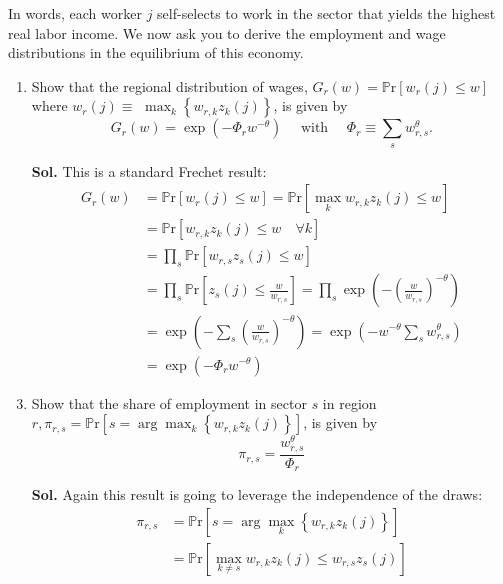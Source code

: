 \documentclass[12pt,oneside,reqno]{amsart}
\newcommand{\pr}{\mathbb{P}\mathrm{r}}
\begin{document}
In words, each worker $j$ self-selects to work in the sector that yields the highest real labor income. We now ask you to derive the employment and wage distributions in the equilibrium of this economy.
\begin{enumerate}[leftmargin=15pt,label=\textbf{\roman*.}]
    \item Show that the regional distribution of wages, $G_{r}(w)=\pr\left[w_{r}(j) \leq w\right]$ where $w_{r}(j) \equiv$ $\max _{k}\left\{w_{r, k} z_{k}(j)\right\}$, is given by
        \begin{equation*}
        G_{r}(w)=\exp \left(-\Phi_{r} w^{-\theta}\right) \quad \text { with } \quad \Phi_{r} \equiv \sum_{s} w_{r, s}^{\theta} .
        \end{equation*}
    \item[\textbf{Sol.}] This is a standard Frechet result:
    \begin{align*}
        G_r(w) &= \pr\left[w_r(j)\leq w\right] = \pr\left[\max_{k}w_{r,k}z_k(j)\leq w\right] \\ 
        &= \pr\left[w_{r,k}z_k(j)\leq w \quad\forall k\right] \\ 
        &= \prod_{s}\pr\left[w_{r,s}z_s(j)\leq w \right] \tag{Independence of $z$} \\ 
        &= \prod_{s}\pr\left[z_s(j)\leq \frac{w}{w_{r,s}} \right] 
        = \prod_{s}\exp\left(-\left(\frac{w}{w_{r,s}}\right)^{-\theta} \right) \\
        &= \exp\left(-\sum_{s}\left(\frac{w}{w_{r,s}}\right)^{-\theta} \right) 
        = \exp\left(-w^{-\theta}\sum_{s} w_{r,s}^{\theta} \right) \\
        &=\exp \left(-\Phi_{r} w^{-\theta}\right)
    \end{align*}
    \item Show that the share of employment in sector $s$ in region $r, \pi_{r, s}=\pr\left[s=\arg \max _{k}\left\{w_{r, k} z_{k}(j)\right\}\right]$, is given by
    \begin{equation*}
        \pi_{r, s}=\frac{w_{r, s}^{\theta}}{\Phi_{r}}
    \end{equation*}
    \item[\textbf{Sol.}] Again this result is going to leverage the independence of the draws: 
    \begin{align*}
        \pi_{r,s} &= \pr\left[s=\arg \max _{k}\left\{w_{r, k} z_{k}(j)\right\} \right]  \\ 
        &= \pr\left[\max_{k\neq s}w_{r,k}z_k(j)\leq w_{r,s}z_s(j) \right] \\ 

\end{align*}
\end{enumerate}
\end{document}
